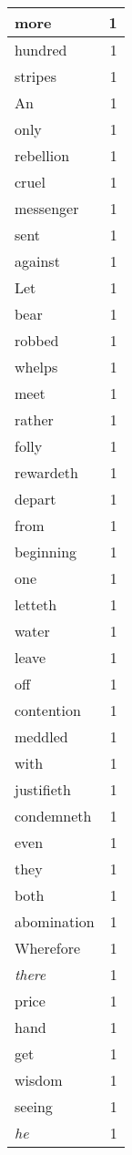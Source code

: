 \begin{center}
\begin{longtable}{l|r}
more & 1\\ \hline 
hundred & 1\\ \hline 
stripes & 1\\ \hline 
An & 1\\ \hline 
only & 1\\ \hline 
rebellion & 1\\ \hline 
cruel & 1\\ \hline 
messenger & 1\\ \hline 
sent & 1\\ \hline 
against & 1\\ \hline 
Let & 1\\ \hline 
bear & 1\\ \hline 
robbed & 1\\ \hline 
whelps & 1\\ \hline 
meet & 1\\ \hline 
rather & 1\\ \hline 
folly & 1\\ \hline 
rewardeth & 1\\ \hline 
depart & 1\\ \hline 
from & 1\\ \hline 
beginning & 1\\ \hline 
one & 1\\ \hline 
letteth & 1\\ \hline 
water & 1\\ \hline 
leave & 1\\ \hline 
off & 1\\ \hline 
contention & 1\\ \hline 
meddled & 1\\ \hline 
with & 1\\ \hline 
justifieth & 1\\ \hline 
condemneth & 1\\ \hline 
even & 1\\ \hline 
they & 1\\ \hline 
both & 1\\ \hline 
abomination & 1\\ \hline 
Wherefore & 1\\ \hline 
\emph{there} & 1\\ \hline 
price & 1\\ \hline 
hand & 1\\ \hline 
get & 1\\ \hline 
wisdom & 1\\ \hline 
seeing & 1\\ \hline 
\emph{he} & 1\\ \hline 

\end{longtable}
\end{center}
